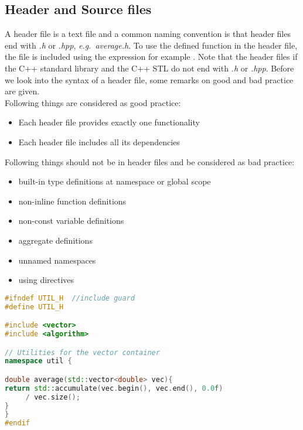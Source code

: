 \subsection{Header and Source files}
A header file is a text file and a common naming convention is that header files end with \textit{.h} or \textit{.hpp}, \emph{e.g.}\ \textit{average.h}. To use the defined function in the header file, the file is included using the  expression for example . Note that the header files if the C++ standard library and the C++ STL do not end with  \textit{.h} or \textit{.hpp}. Before we look into the syntax of a header file, some remarks on good and bad practice are given.\\ 

\noindent Following things are considered as good practice:
\begin{itemize}
\item Each header file provides exactly one functionality 
\item Each header file includes all its dependencies
\end{itemize}
Following things should not be in header files and be considered as bad practice:\\
\begin{itemize}
\item built-in type definitions at namespace or global scope
\item non-inline function definitions
\item non-const variable definitions
\item aggregate definitions
\item unnamed namespaces
\item using directives
\end{itemize}

\begin{lstlisting}[language=c++,caption={Example for header file.\label{code:header}},float,floatplacement=tb]
#ifndef UTIL_H  //include guard
#define UTIL_H

#include <vector>
#include <algorithm>

// Utilities for the vector container
namespace util {

double average(std::vector<double> vec){
return std::accumulate(vec.begin(), vec.end(), 0.0f) 
     / vec.size();
}
}
#endif
\end{lstlisting}
\vspace{0.25cm}

